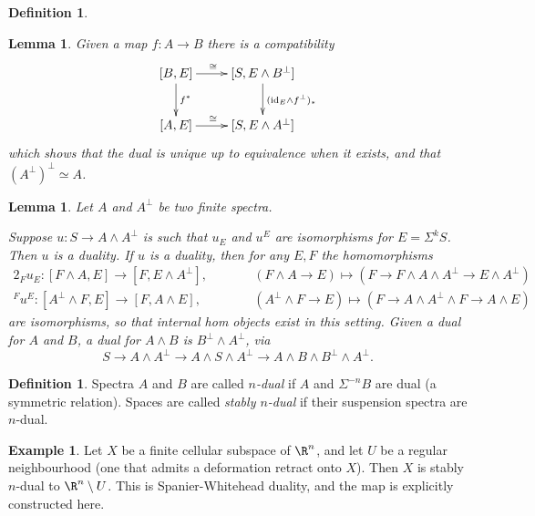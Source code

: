 \documentclass[11pt]{article}
\theoremstyle{plain}
\newtheorem{lem}[thm]{Lemma}
\theoremstyle{definition}
\newtheorem{defn}[thm]{Definition}
\newtheorem{exmp}[thm]{Example}
\begin{document}
{\begin{defn}
\end{defn}
\begin{lem}
Given a map $f:A\to B$ there is a compatibility
\[\xymatrix{
\ar[d]^{f^*}[B,E]\ar[r]^{\cong\ \ \ }&
[S,E\wedge B^\perp]\ar[d]^{(\id_E\wedge f^\perp)_*}\\
[A,E]\ar[r]^{\cong\ \ \ }&[S,E\wedge A^\perp]
}\]
which shows that the dual is unique up to equivalence when it exists, and that
$(A^\perp)^\perp\simeq A$.
\end{lem}
\begin{lem}
Let $A$ and $A^\perp$ be two finite spectra.
\begin{itemise}
\itm[(i)]Suppose $u:S\to A\wedge A^\perp$ is such that $u_E$ and $u^E$ are
isomorphisms for $E=\Sigma^k S$. Then $u$ is a duality.
\itm[(ii)]If $u$ is a duality, then for any $E,F$ the homomorphisms
\begin{alignat*}{2}
_Fu_E:[F\wedge A,E]\to[F,E\wedge A^\perp],&\qquad &
(F\wedge A\to E)\mapsto (F\to F\wedge A\wedge A^\perp\to E\wedge A^\perp)\\
^Fu^E:[A^\perp\wedge F,E]\to[F,A\wedge E],&\qquad &
(A^\perp\wedge F\to E)\mapsto (F\to A\wedge A^\perp\wedge F\to A\wedge E)
\end{alignat*}
are isomorphisms, so that internal hom objects exist in this setting.
\itm[(iii)]Given a dual for $A$ and $B$, a dual for $A\wedge B$ is
$B^\perp\!\wedge A^\perp$, via\upcol
\[S\to A\wedge A^\perp\to A\wedge S\wedge A^\perp\to 
A\wedge B\wedge B^\perp\!\wedge A^\perp.\]
\end{itemise}
\end{lem}
\setcounter{thm}{6}
\begin{defn}
Spectra $A$ and $B$ are called \emph{$n$-dual} if $A$ and $\Sigma^{-n}B$ are
dual (a symmetric relation). Spaces are called \emph{stably $n$-dual} if their
suspension spectra are $n$-dual.
\end{defn}
\begin{exmp}
Let $X$ be a finite cellular subspace of $\R^n$, and let $U$ be a regular
neighbourhood (one that admits a deformation retract onto $X$). Then $X$ is
stably $n$-dual to $\R^n\setminus U$. This is Spanier-Whitehead duality, and the
map is explicitly constructed here.


\end{exmp}}
\end{document}
